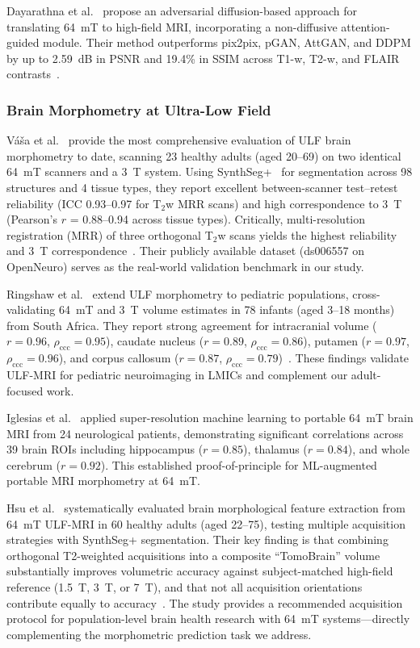 Dayarathna et al.~\cite{dayarathna2024adversarial} propose an adversarial diffusion-based approach for translating 64~mT to high-field MRI, incorporating a non-diffusive attention-guided module. Their method outperforms pix2pix, pGAN, AttGAN, and DDPM by up to 2.59~dB in PSNR and 19.4\% in SSIM across T1-w, T2-w, and FLAIR contrasts~\cite{dayarathna2024adversarial}.

\subsubsection{Brain Morphometry at Ultra-Low Field}

V\'{a}\v{s}a et al.~\cite{vasa2025morphometry} provide the most comprehensive evaluation of ULF brain morphometry to date, scanning 23 healthy adults (aged 20--69) on two identical 64~mT scanners and a 3~T system. Using SynthSeg+~\cite{billot2023synthseg} for segmentation across 98 structures and 4 tissue types, they report excellent between-scanner test--retest reliability (ICC 0.93--0.97 for T$_2$w MRR scans) and high correspondence to 3~T (Pearson's $r$ = 0.88--0.94 across tissue types). Critically, multi-resolution registration (MRR) of three orthogonal T$_2$w scans yields the highest reliability and 3~T correspondence~\cite{vasa2025morphometry}. Their publicly available dataset (ds006557 on OpenNeuro) serves as the real-world validation benchmark in our study.

Ringshaw et al.~\cite{ringshaw2026infant} extend ULF morphometry to pediatric populations, cross-validating 64~mT and 3~T volume estimates in 78 infants (aged 3--18 months) from South Africa. They report strong agreement for intracranial volume ($r = 0.96$, $\rho_{\text{ccc}} = 0.95$), caudate nucleus ($r = 0.89$, $\rho_{\text{ccc}} = 0.86$), putamen ($r = 0.97$, $\rho_{\text{ccc}} = 0.96$), and corpus callosum ($r = 0.87$, $\rho_{\text{ccc}} = 0.79$)~\cite{ringshaw2026infant}. These findings validate ULF-MRI for pediatric neuroimaging in LMICs and complement our adult-focused work.

Iglesias et al.~\cite{iglesias2023radiology} applied super-resolution machine learning to portable 64~mT brain MRI from 24 neurological patients, demonstrating significant correlations across 39 brain ROIs including hippocampus ($r = 0.85$), thalamus ($r = 0.84$), and whole cerebrum ($r = 0.92$). This established proof-of-principle for ML-augmented portable MRI morphometry at 64~mT.

Hsu et al.~\cite{hsu2025morphological} systematically evaluated brain morphological feature extraction from 64~mT ULF-MRI in 60 healthy adults (aged 22--75), testing multiple acquisition strategies with SynthSeg+ segmentation. Their key finding is that combining orthogonal T2-weighted acquisitions into a composite ``TomoBrain'' volume substantially improves volumetric accuracy against subject-matched high-field reference (1.5~T, 3~T, or 7~T), and that not all acquisition orientations contribute equally to accuracy~\cite{hsu2025morphological}. The study provides a recommended acquisition protocol for population-level brain health research with 64~mT systems---directly complementing the morphometric prediction task we address.

